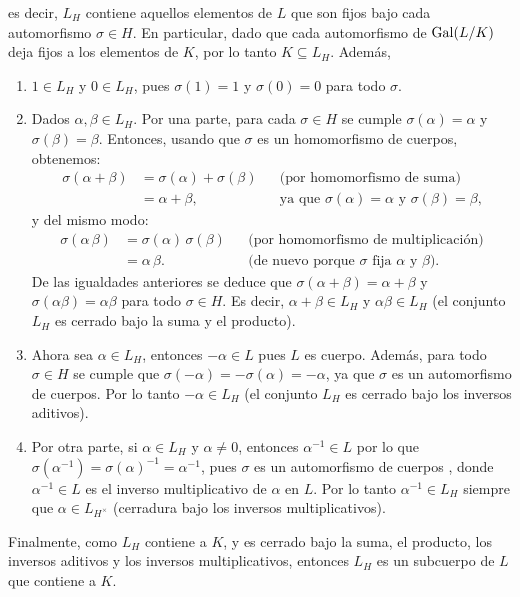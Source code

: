 \begin{solucion}
es decir, $L_H$ contiene aquellos elementos de $L$ que son fijos bajo cada automorfismo $\sigma\in H$. En particular, dado que cada automorfismo de $\mathrm{Gal}(L/K)$ deja fijos a los elementos de $K$, por lo tanto $K\subseteq L_H$. Además, 
\begin{enumerate}
    \item $1\in L_H$ y $0\in L_H$, pues $\sigma(1)=1$ y $\sigma(0)=0$ para todo $\sigma$.
    \item Dados $\alpha,\beta\in L_H$. Por una parte, para cada $\sigma\in H$ se cumple $\sigma(\alpha)=\alpha$ y $\sigma(\beta)=\beta$. Entonces, usando que $\sigma$ es un homomorfismo de cuerpos, obtenemos: 
    \begin{align*}
        \sigma(\alpha + \beta) &= \sigma(\alpha) + \sigma(\beta) &&\text{(por homomorfismo de suma)}\\ 
        &= \alpha + \beta, &&\text{ya que $\sigma(\alpha)=\alpha$ y $\sigma(\beta)=\beta$,}
    \end{align*}
    y del mismo modo: 
    \begin{align*}
        \sigma(\alpha\,\beta) &= \sigma(\alpha)\,\sigma(\beta) &&\text{(por homomorfismo de multiplicación)}\\ 
        &= \alpha\,\beta. &&\text{(de nuevo porque $\sigma$ fija $\alpha$ y $\beta$).}
    \end{align*}
    De las igualdades anteriores se deduce que $\sigma(\alpha+\beta)=\alpha+\beta$ y $\sigma(\alpha\beta)=\alpha\beta$ para todo $\sigma\in H$. Es decir, $\alpha+\beta\in L_H$ y $\alpha\beta\in L_H$ (el conjunto $L_H$ es cerrado bajo la suma y el producto).
    \item Ahora sea $\alpha\in L_H$, entonces $-\alpha \in L$ pues $L$ es cuerpo. Además, para todo $\sigma\in H$ se cumple que $\sigma(-\alpha) = -\sigma(\alpha) = -\alpha$, ya que $\sigma$ es un automorfismo de cuerpos. Por lo tanto $-\alpha\in L_H$ (el conjunto $L_H$ es cerrado bajo los inversos aditivos).
    \item Por otra parte, si $\alpha\in L_H$ y $\alpha\neq 0$, entonces $\alpha^{-1} \in L$ por lo que   $\sigma(\alpha^{-1}) = \sigma(\alpha)^{-1} = \alpha^{-1}$, pues $\sigma$ es un automorfismo de cuerpos
    , donde $\alpha^{-1}\in L$ es el inverso multiplicativo de $\alpha$ en $L$. Por lo tanto $\alpha^{-1}\in L_H$ siempre que $\alpha\in L_{H^\times}$ (cerradura bajo los inversos multiplicativos). 
\end{enumerate}

Finalmente, como $L_H$ contiene a $K$, y es cerrado bajo la suma, el producto, los inversos aditivos y los inversos multiplicativos, entonces $L_H$ es un subcuerpo de $L$ que contiene a $K$.

\end{solucion}